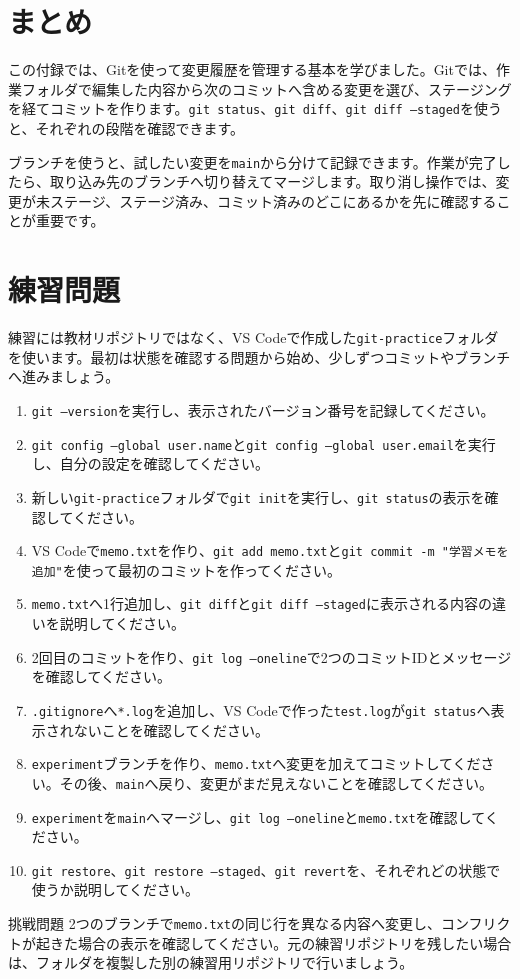 \section{まとめ}

この付録では、Gitを使って変更履歴を管理する基本を学びました。Gitでは、作業フォルダで編集した内容から次のコミットへ含める変更を選び、ステージングを経てコミットを作ります。\texttt{git status}、\texttt{git diff}、\texttt{git diff --staged}を使うと、それぞれの段階を確認できます。

ブランチを使うと、試したい変更を\texttt{main}から分けて記録できます。作業が完了したら、取り込み先のブランチへ切り替えてマージします。取り消し操作では、変更が未ステージ、ステージ済み、コミット済みのどこにあるかを先に確認することが重要です。

\section{練習問題}

練習には教材リポジトリではなく、VS Codeで作成した\texttt{git-practice}フォルダを使います。最初は状態を確認する問題から始め、少しずつコミットやブランチへ進みましょう。

\begin{enumerate}
    \item \texttt{git --version}を実行し、表示されたバージョン番号を記録してください。
    \item \texttt{git config --global user.name}と\texttt{git config --global user.email}を実行し、自分の設定を確認してください。
    \item 新しい\texttt{git-practice}フォルダで\texttt{git init}を実行し、\texttt{git status}の表示を確認してください。
    \item VS Codeで\texttt{memo.txt}を作り、\texttt{git add memo.txt}と\texttt{git commit -m "学習メモを追加"}を使って最初のコミットを作ってください。
    \item \texttt{memo.txt}へ1行追加し、\texttt{git diff}と\texttt{git diff --staged}に表示される内容の違いを説明してください。
    \item 2回目のコミットを作り、\texttt{git log --oneline}で2つのコミットIDとメッセージを確認してください。
    \item \texttt{.gitignore}へ\texttt{*.log}を追加し、VS Codeで作った\texttt{test.log}が\texttt{git status}へ表示されないことを確認してください。
    \item \texttt{experiment}ブランチを作り、\texttt{memo.txt}へ変更を加えてコミットしてください。その後、\texttt{main}へ戻り、変更がまだ見えないことを確認してください。
    \item \texttt{experiment}を\texttt{main}へマージし、\texttt{git log --oneline}と\texttt{memo.txt}を確認してください。
    \item \texttt{git restore}、\texttt{git restore --staged}、\texttt{git revert}を、それぞれどの状態で使うか説明してください。
\end{enumerate}

\begin{notebox}{挑戦問題}
2つのブランチで\texttt{memo.txt}の同じ行を異なる内容へ変更し、コンフリクトが起きた場合の表示を確認してください。元の練習リポジトリを残したい場合は、フォルダを複製した別の練習用リポジトリで行いましょう。
\end{notebox}
